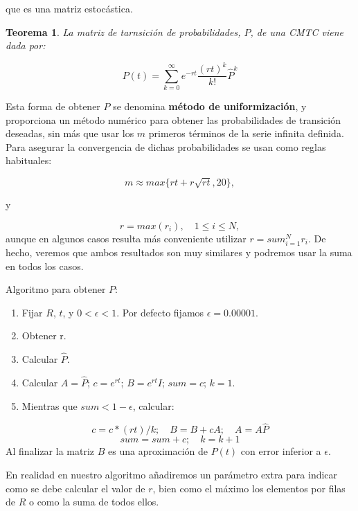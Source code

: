 \documentclass[
]{book}
\providecommand{\tightlist}{%
  \setlength{\itemsep}{0pt}\setlength{\parskip}{0pt}}
\newenvironment{silverbox}{
  \definecolor{shadecolor}{rgb}{192, 192, 192}  
  \color{black}
  \begin{shaded}}
 {\end{shaded}}
\newtheorem{theorem}{Teorema}[chapter]
\theoremstyle{definition}
\theoremstyle{definition}
\theoremstyle{definition}
\theoremstyle{definition}
\theoremstyle{remark}
\begin{document}
que es una matriz estocástica.

\begin{theorem}
La matriz de tarnsición de probabilidades, \(P\), de una CMTC viene dada por:

\[P(t) = \sum_{k=0}^{\infty} e^{-rt}\frac{(rt)^k}{k!} \hat{P}^k\]
\end{theorem}

Esta forma de obtener \(P\) se denomina \textbf{método de uniformización}, y proporciona un método numérico para obtener las probabilidades de transición deseadas, sin más que usar los \(m\) primeros términos de la serie infinita definida. Para asegurar la convergencia de dichas probabilidades se usan como reglas habituales:

\[m \approx max\{rt + r\sqrt{rt}, 20\},\]

y

\[r = max(r_i), \quad 1\leq i \leq N,\]
aunque en algunos casos resulta más conveniente utilizar \(r = sum_{i=1}^N r_i\). De hecho, veremos que ambos resultados son muy similares y podremos usar la suma en todos los casos.

\begin{silverbox}
Algoritmo para obtener \(P\):

\begin{enumerate}
\def\labelenumi{\arabic{enumi}.}
\tightlist
\item
  Fijar \(R\), \(t\), y \(0 < \epsilon < 1\). Por defecto fijamos \(\epsilon = 0.00001\).
\item
  Obtener r.
\item
  Calcular \(\hat{P}\).
\item
  Calcular \(A = \hat{P}\); \(c = e^{rt}\); \(B = e^{rt}I\); \(sum = c\); \(k=1.\)
\item
  Mientras que \(sum < 1-\epsilon\), calcular:
\end{enumerate}

\[c = c*(rt)/k; \quad B = B + cA; \quad A = A \hat{P}\]
\[sum = sum + c; \quad k = k + 1\]
Al finalizar la matriz \(B\) es una aproximación de \(P(t)\) con error inferior a \(\epsilon\).

\end{silverbox}

En realidad en nuestro algoritmo añadiremos un parámetro extra para indicar como se debe calcular el valor de \(r\), bien como el máximo los elementos por filas de \(R\) o como la suma de todos ellos.
\end{document}
